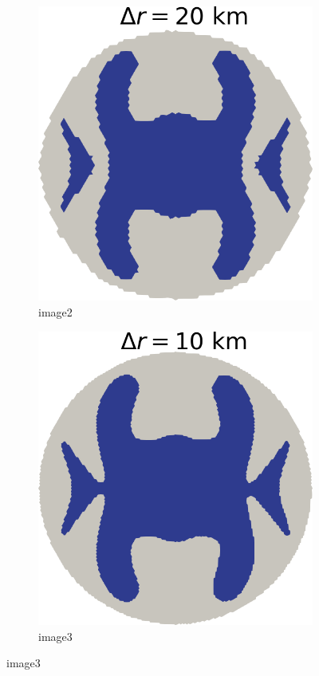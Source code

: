 \documentclass{article}
\begin{document}
\begin{figure}[!h]
\begin{subfigure}{0.25\textwidth}
		\includegraphics[width=\linewidth]{../fig/Grounded_zone_20km.png}
		\caption{image2}
		\label{fig:2}
	\end{subfigure}\hfil %
	\begin{subfigure}{0.25\textwidth}
		\includegraphics[width=\linewidth]{../fig/Grounded_zone_10km.png}
		\caption{image3}
		\label{fig:3}
	\end{subfigure}
	

\end{figure}
\end{document}
